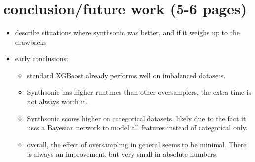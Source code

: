 \documentclass{article}
\begin{document}
\section{conclusion/future work (5-6 pages)}
    \begin{itemize}
        \item describe situations where synthsonic was better, and if it weighs up to the drawbacks
        \item early conclusions:
        \begin{itemize}
            \item standard XGBoost already performs well on imbalanced datasets.
            \item Synthsonic has higher runtimes than other oversamplers, the extra time is not always worth it.
            \item Synthsonic scores higher on categorical datasets, likely due to the fact it uses a Bayesian network to model all features instead of categorical only.
            \item overall, the effect of oversampling in general seems to be minimal. There is always an improvement, but very small in absolute numbers.
        \end{itemize}
    \end{itemize}
\end{document}

